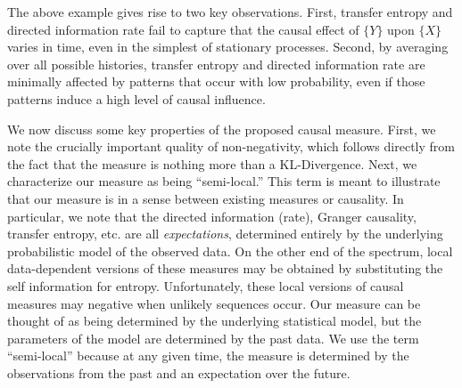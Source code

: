The above example gives rise to two key observations. First, transfer entropy and directed information rate fail to capture that the causal effect of $\{Y\}$ upon $\{X\}$ varies in time, even in the simplest of stationary processes. Second, by averaging over all possible histories, transfer entropy and directed information rate are minimally affected by patterns that occur with low probability, even if those patterns induce a high level of causal influence.

We now discuss some key properties of the proposed causal measure. First, we note the crucially important quality of non-negativity, which follows directly from the fact that the measure is nothing more than a KL-Divergence. Next, we characterize our measure as being ``semi-local.'' This term is meant to illustrate that our measure is in a sense between existing measures or causality. In particular, we note that the directed information (rate), Granger causality, transfer entropy, etc. are all \emph{expectations}, determined entirely by the underlying probabilistic model of the observed data. On the other end of the spectrum, local data-dependent versions of these measures may be obtained by substituting the self information for entropy. Unfortunately, these local versions of causal measures may negative when unlikely sequences occur. Our measure can be thought of as being determined by the underlying statistical model, but the parameters of the model are determined by the past data. We use the term ``semi-local'' because at any given time, the measure is determined by the observations from the past and an expectation over the future.





